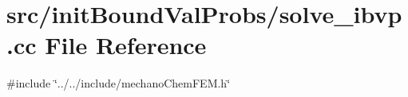 \section{src/init\+Bound\+Val\+Probs/solve\+\_\+ibvp.cc File Reference}
\label{solve__ibvp_8cc}
{\ttfamily \#include \char`\"{}../../include/mechano\+Chem\+F\+E\+M.\+h\char`\"{}}\newline
